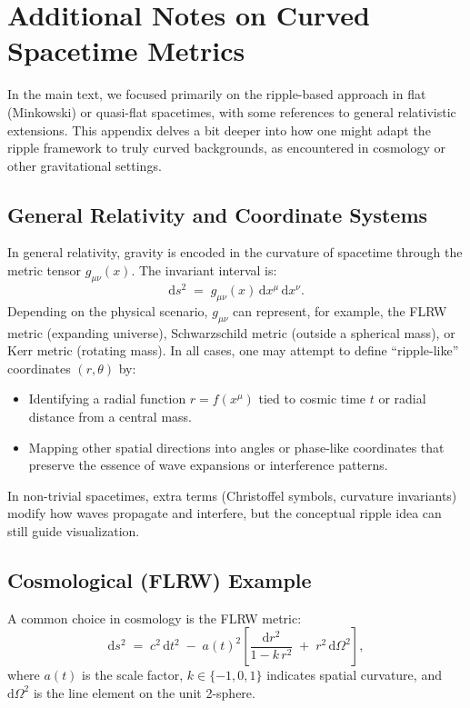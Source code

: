 \documentclass[11pt]{article}
\begin{document}
\section{Additional Notes on Curved Spacetime Metrics}
\label{app:curved-metrics}

In the main text, we focused primarily on the ripple-based approach 
in flat (Minkowski) or quasi-flat spacetimes, with some references to 
general relativistic extensions. This appendix delves a bit deeper 
into how one might adapt the ripple framework to truly curved 
backgrounds, as encountered in cosmology or other gravitational 
settings.

\subsection{General Relativity and Coordinate Systems}
\label{app:subsec:GR-coord}
In general relativity, gravity is encoded in the curvature of spacetime 
through the metric tensor $g_{\mu\nu}(x)$. The invariant interval is:
\[
  \mathrm{d}s^2 \;=\; g_{\mu\nu}(x)\,\mathrm{d}x^\mu\,\mathrm{d}x^\nu.
\]
Depending on the physical scenario, $g_{\mu\nu}$ can represent, for example, 
the FLRW metric (expanding universe), Schwarzschild metric (outside a spherical mass), 
or Kerr metric (rotating mass). In all cases, one may attempt to define 
``ripple-like'' coordinates $(r,\theta)$ by:

\begin{itemize}
  \item Identifying a radial function $r = f(x^\mu)$ tied to cosmic time $t$ 
        or radial distance from a central mass.
  \item Mapping other spatial directions into angles or phase-like coordinates 
        that preserve the essence of wave expansions or interference patterns.
\end{itemize}

In non-trivial spacetimes, extra terms (Christoffel symbols, curvature invariants) 
modify how waves propagate and interfere, but the conceptual ripple idea 
can still guide visualization.

\subsection{Cosmological (FLRW) Example}
\label{app:subsec:FLRW-example}
A common choice in cosmology is the FLRW metric:
\[
  \mathrm{d}s^2 \;=\; c^2\,\mathrm{d}t^2 
    \;-\; a(t)^2 \left[\frac{\mathrm{d}r^2}{1 - k\,r^2} 
    \;+\; r^2\,\mathrm{d}\Omega^2\right],
\]
where $a(t)$ is the scale factor, $k \in \{-1,0,1\}$ indicates spatial curvature, 
and $\mathrm{d}\Omega^2$ is the line element on the unit 2-sphere. 
\end{document}
